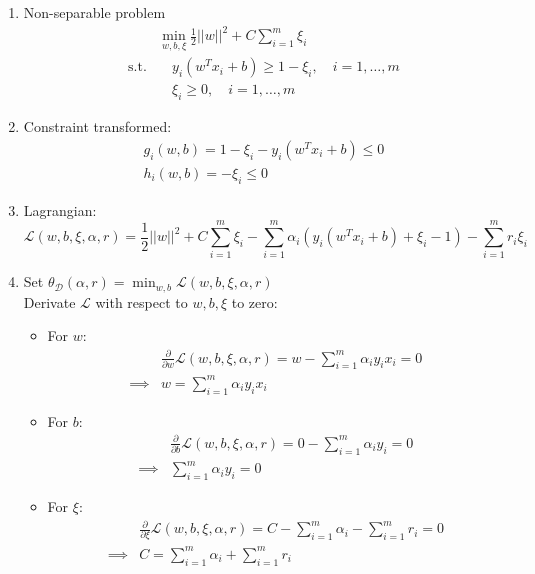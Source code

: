 \documentclass[a4paper]{article}
\begin{document}
\begin{enumerate}
\item{Non-separable problem
\begin{align*}
	& \min_{w, b, \xi} \frac{1}{2} ||w||^2 + C \sum_{i=1}^{m}\xi_i\\
	\text{s.t.}  &\quad y_i (w^T x_i + b) \geq 1 - \xi_i, \quad i = 1, \dots, m \\
	& \quad \xi_i \geq 0, \quad i = 1, \dots, m  
\end{align*}}

\item{Constraint transformed: 
	\begin{align*}
	g_i (w, b) = 1- \xi_i -y_i (w^T x_i + b) \leq 0 \\
	h_i (w, b) = - \xi_i \leq 0
	\end{align*}
}

\item{Lagrangian: 
$$\mathcal{L}(w, b, \xi, \alpha, r) = \frac{1}{2} ||w||^2 + C \sum_{i=1}^{m}\xi_i - \sum_{i=1}^{m}\alpha_i (y_i(w^T x_i +b) + \xi_i - 1) - \sum_{i=1}^{m}r_i \xi_i$$} 

\item{Set $\theta_{\mathcal{D}}(\alpha, r) = \min_{w, b} \mathcal{L}(w, b, \xi, \alpha, r)$} \\
	Derivate $\mathcal{L}$ with respect to $w, b, \xi$ to zero:
	\begin{itemize}
		\item {For $w$: 
		\begin{align}
			&\frac{\partial}{\partial w}\mathcal{L}(w, b, \xi, \alpha, r) = w - \sum_{i=1}^{m}\alpha_i y_i x_i = 0 \nonumber \\ 
			\implies & w = \sum_{i=1}^{m}\alpha_i y_i x_i 
		\end{align}}
		\item {For $b$:
		\begin{align}
			&\frac{\partial}{\partial b}\mathcal{L}(w, b, \xi, \alpha, r) = 0 - \sum_{i=1}^{m}\alpha_i y_i = 0 \nonumber \\
			\implies & \sum_{i=1}^{m}\alpha_i y_i = 0 
		\end{align}}
		\item { For $\xi$:
		\begin{align}
			&\frac{\partial}{\partial \xi}\mathcal{L}(w, b, \xi, \alpha, r) = C - \sum_{i=1}^{m} \alpha_i - \sum_{i=1}^{m} r_i = 0 \nonumber \\
			\implies & C = \sum_{i=1}^{m} \alpha_i + \sum_{i=1}^{m} r_i 
		\end{align}
		}
	\end{itemize}


\end{enumerate}
\end{document}
